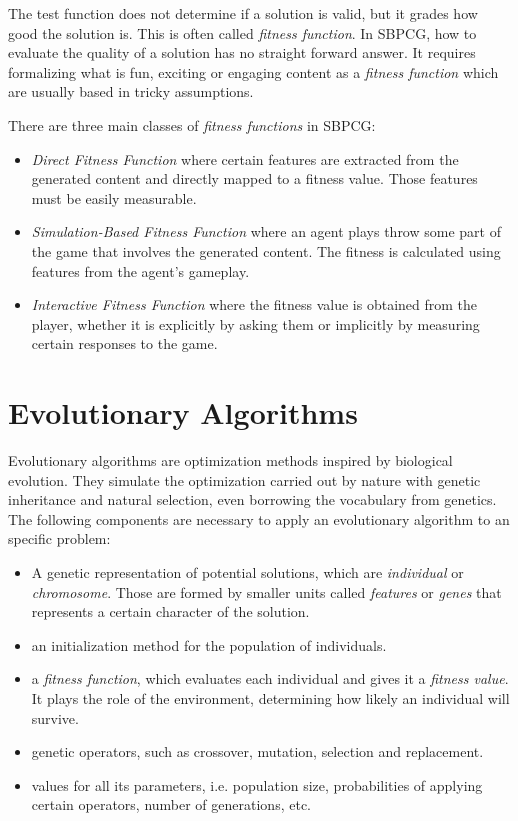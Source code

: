 The test function does not determine if a solution is valid, but it grades how good the solution is. This is often called \textit{fitness function}. In \ac{SBPCG}, how to evaluate the quality of a solution has no straight forward answer. It requires formalizing what is fun, exciting or engaging content  as a \textit{fitness function} which are usually based in tricky assumptions. 

There are three main classes of \textit{fitness functions} in \ac{SBPCG}\cite{togelius2010search}:

\begin{itemize}
	\item \textit{Direct Fitness Function} where certain features are extracted from the generated  content and directly mapped to a fitness value. Those features must be easily measurable.
	\item \textit{Simulation-Based Fitness Function} where an agent plays throw some part of the game that involves the generated content. The fitness is calculated using features from the agent's gameplay.
	\item \textit{Interactive Fitness Function} where the fitness value is obtained from the player, whether it is explicitly by asking them or implicitly by measuring certain responses to the game.
\end{itemize}


\section{Evolutionary Algorithms}\label{s:EAoverview}

Evolutionary algorithms are optimization methods inspired by biological evolution. They simulate the optimization carried out by nature with genetic inheritance and natural selection, even borrowing the vocabulary from genetics. The following components are necessary to apply an evolutionary algorithm to an specific problem:
\begin{itemize}
	\item A genetic representation of potential solutions, which are \textit{individual} or \textit{chromosome}. Those are formed by smaller units called \textit{features} or \textit{genes} that represents a certain character of the solution.
	\item an initialization method for the population of individuals.
	\item a \textit{fitness function}, which evaluates each individual and gives it a \textit{fitness value}. It plays the role of the environment, determining how likely an individual will survive.
	\item genetic operators, such as crossover, mutation, selection and replacement.
	\item values for all its parameters, i.e. population size, probabilities of applying certain operators, number of generations, etc.
\end{itemize}

